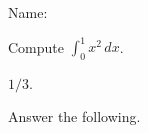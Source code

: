 \documentclass[11pt,addpoints]{exam}
\begin{document}
\noindent Name: \makebox[3in]{\hrulefill}
\begin{center}\gradetable[h][questions]\end{center}
\begin{questions}
\question[5] Compute $\int_0^1 x^2\,dx$.
\begin{solution} $1/3$. \end{solution}
\question Answer the following.
\end{questions}
\end{document}
